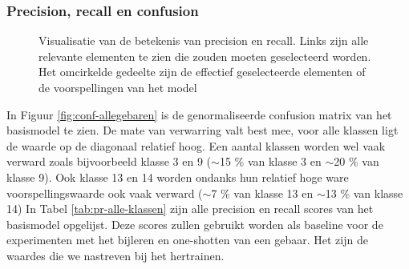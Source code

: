 \subsubsection{Precision, recall en confusion}\label{sec:pr-conf}
\begin{figure}
	\centering
	\def\svgwidth{0.7\columnwidth}
	
	\caption{Visualisatie van de betekenis van precision en recall. Links zijn alle relevante elementen te zien die zouden moeten geselecteerd worden. Het omcirkelde gedeelte zijn de effectief geselecteerde elementen of de voorspellingen van het model}
	\label{fig:prec+recall}
\end{figure}

\npar In Figuur \ref{fig:conf-allegebaren} is de genormaliseerde confusion matrix van het basismodel te zien. De mate van verwarring valt best mee, voor alle klassen ligt de waarde op de diagonaal relatief hoog. Een aantal klassen worden wel vaak verward zoals bijvoorbeeld klasse 3 en 9 ($\sim$15 \% van klasse 3 en $\sim$20 \% van klasse 9). Ook klasse 13 en 14 worden ondanks hun relatief hoge ware voorspellingswaarde ook vaak verward ($\sim$7 \% van klasse 13 en $\sim$13 \% van klasse 14)
\npar In Tabel \ref{tab:pr-alle-klassen} zijn alle precision en recall scores van het basismodel opgelijst. Deze scores zullen gebruikt worden als baseline voor de experimenten met het bijleren en one-shotten van een gebaar. Het zijn de waardes die we nastreven bij het hertrainen.
